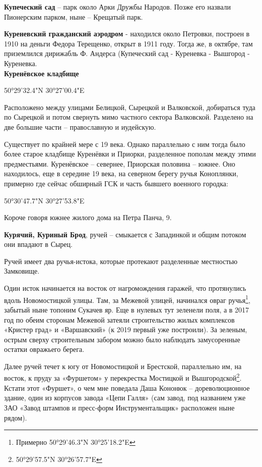 \medskip

\textbf{Купеческий сад} – парк около Арки Дружбы Народов. Позже его назвали Пионерским парком, ныне – Крещатый парк.\\

\medskip

\textbf{Куреневский гражданский аэродром} - находился около Петровки, построен в 1910 на деньги Федора Терещенко, открыт в 1911 году. Тогда же, в октябре, там приземлился дирижабль Ф. Андерса (Купеческий сад - Куреневка - Вышгород - Куреневка.\\ 

\textbf{Куренёвское кладбище} 

50°29'32.4"N 30°27'00.4"E

Расположено между улицами Белицкой, Сырецкой и Валковской, добираться туда по Сырецкой и потом свернуть мимо частного сектора Валковской. Разделено на две большие части – православную и иудейскую. 

Существует по крайней мере с 19 века. Однако параллельно с ним тогда было более старое кладбище Куренёвки и Приорки, разделенное пополам между этими предместьями. Куренёвское – севернее, Приорская половина – южнее. Оно находилось, еще в середине 19 века, на северном берегу ручья Коноплянки, примерно где сейчас обширный ГСК и часть бывшего военного городка:

50°30'47.7"N 30°27'53.8"E

Короче говоря южнее жилого дома на Петра Панча, 9.\\

\medskip


\textbf{Курячий, Куриный Брод}, ручей – смыкается с Западинкой и общим потоком они впадают в Сырец.

Ручей имеет два ручья-истока, которые протекают разделенные местностью Замковище. 

Один исток начинается на восток от нагромождения гаражей, что протянулись вдоль Новомостицкой улицы. Там, за Межевой улицей,  начинался овраг ручья\footnote{Примерно 50°29'46.3"N 30°25'18.2"E}, забытый ныне топоним Сукачев яр. Еще в нулевых тут зеленели поля, а в 2017 год по обеим сторонам Межевой затеяли строительство жилых комплексов «Кристер град» и «Варшавский» (к 2019 первый уже построили). За зеленым, острым сверху строительным забором можно было наблюдать замусоренные остатки овражьего берега.

Далее ручей течет к югу от Новомостицкой и Брестской, параллельно им, на восток, к пруду за «Фуршетом» у перекрестка Мостицкой и Вышгородской\footnote{50°29'57.5"N 30°26'57.7"E}. Кстати этот «Фуршет», о чем мне поведала Даша Кононюк – дореволюционное здание, один из корпусов завода «Цепи Галля» (сам завод, под названием уже ЗАО «Завод штампов и пресс-форм Инструментальщик»  расположен ныне рядом).

